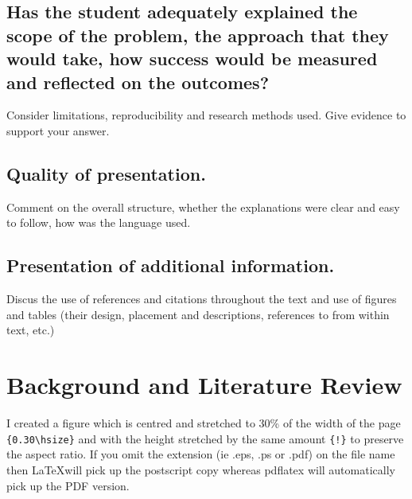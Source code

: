 \documentclass{article}
\begin{document}
\subsection*{Has the student adequately explained the scope of the problem, the approach that they would take, how success would be measured and reflected on the outcomes?}

Consider limitations, reproducibility and research methods used. Give evidence to support your answer. 

\subsection*{Quality of presentation.}
Comment on the overall structure, whether the explanations were clear and easy to follow, how was the language used. 

\subsection*{Presentation of additional information.}
Discus the use of references and citations throughout the text and use of figures and tables (their design, placement and descriptions, references to from within text, etc.)

\section{Background and Literature Review}

I created a figure which is centred and stretched to 30\% of the
width of the page \verb+{0.30\hsize}+ and with the height stretched by
the same amount \verb+{!}+ to preserve the aspect ratio. If you omit the
extension (ie .eps, .ps or .pdf) on the file name then \LaTeX  will pick
up the postscript copy whereas pdflatex will automatically pick up the
PDF version.
\end{document}
